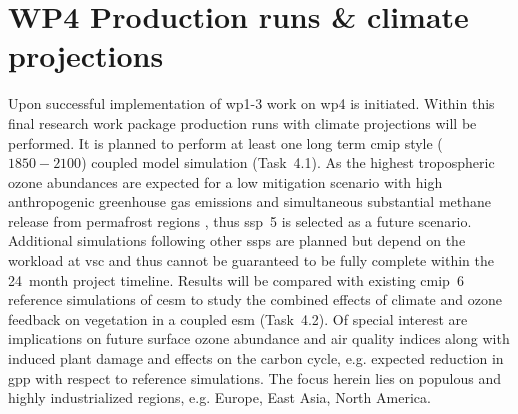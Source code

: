 \section{WP4 Production runs \& climate projections}
\label{sec:wp4}
Upon successful implementation of \gls{wp}1-3 work on \gls{wp}4 is initiated. Within this final research work package production runs with climate projections will be performed. It is planned to perform at least one long term \gls{cmip} style ($1850-2100$) coupled model simulation (Task~4.1). As the highest tropospheric ozone abundances are expected for a low mitigation scenario with high anthropogenic greenhouse gas emissions and simultaneous substantial methane release from permafrost regions \parencites[e.g.][]{JGR:Rieder2015}{AE:Rieder2018}, thus \gls{ssp}~5 is selected as a future scenario. Additional simulations following other \glspl{ssp} are planned but depend on the workload at \gls{vsc} and thus cannot be guaranteed to be fully complete within the 24~month project timeline. Results will be compared with existing \gls{cmip}~6 reference simulations of \gls{cesm} to study the combined effects of climate and ozone feedback on vegetation in a coupled \gls{esm} (Task~4.2). Of special interest are implications on future surface ozone abundance and air quality indices along with induced plant damage and effects on the carbon cycle, e.g. expected reduction in \gls{gpp} with respect to reference simulations. The focus herein lies on populous and highly industrialized regions, e.g. Europe, East Asia, North America.

